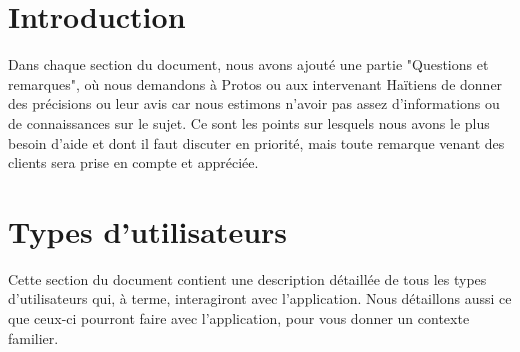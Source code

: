 \documentclass[a4paper, 11pt]{article}
\begin{document}
\section{Introduction}
Dans chaque section du document, nous avons ajouté une partie "Questions et remarques", où nous demandons à Protos ou aux intervenant Haïtiens de donner des précisions ou leur avis car nous estimons n'avoir pas assez d'informations ou de connaissances sur le sujet. Ce sont les points sur lesquels nous avons le plus besoin d'aide et dont il faut discuter en priorité, mais toute remarque venant des clients sera prise en compte et appréciée.
\section{Types d'utilisateurs}
Cette section du document contient une description détaillée de tous les types d'utilisateurs qui, à terme, interagiront avec l'application. Nous détaillons aussi ce que ceux-ci pourront faire avec l'application, pour vous donner un contexte familier.
\end{document}
